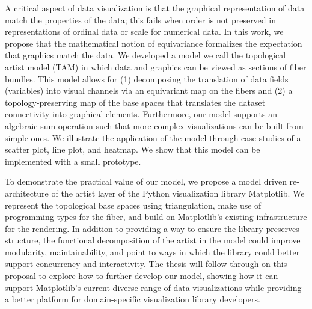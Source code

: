  A critical aspect of data visualization is that the graphical representation of data match the properties of the data; this fails when order is not preserved in representations of ordinal data or scale for numerical data. In this work, we propose that the mathematical notion of equivariance formalizes the expectation that graphics match the data. We developed a model we call the topological artist model (TAM) in which data and graphics can be viewed as sections of fiber bundles. This model allows for (1) decomposing the translation of data fields (variables) into visual channels via an equivariant map on the fibers and (2) a topology-preserving map of the base spaces that translates the dataset connectivity into graphical elements. Furthermore, our model supports an algebraic sum operation such that more complex visualizations can be built from simple ones. We illustrate the application of the model through case studies of a scatter plot, line plot, and heatmap. We show that this model can be implemented with a small prototype.

To demonstrate the practical value of our model, we propose a model driven re-architecture of the artist layer of the Python visualization library Matplotlib. We represent the topological base spaces using triangulation, make use of programming types for the fiber, and build on Matplotlib's existing infrastructure for the rendering. In addition to providing a way to ensure the library preserves structure, the functional decomposition of the artist in the model could improve modularity, maintainability, and point to ways in which the library could better support concurrency and interactivity. The thesis will follow through on this proposal to explore how to further develop our model, showing how it can support Matplotlib's current diverse range of data visualizations while providing a better platform for domain-specific visualization library developers.
